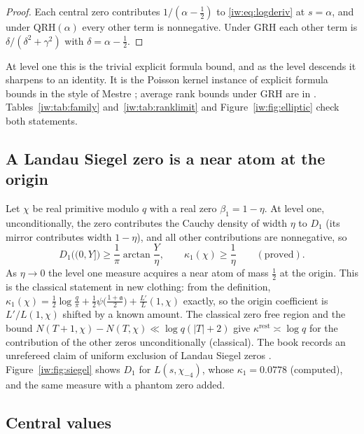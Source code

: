 \begin{proof}
Each central zero contributes $1/(\alpha-\frac12)$ to \eqref{iw:eq:logderiv} at $s=\alpha$, and under $\mathrm{QRH}(\alpha)$ every other term is nonnegative. Under GRH each other term is $\delta/(\delta^2+\gamma^2)$ with $\delta=\alpha-\frac12$.
\end{proof}

At level one this is the trivial explicit formula bound, and as the level descends it sharpens to an identity. It is the Poisson kernel instance of explicit formula bounds in the style of Mestre \cite{NCMestre86}; average rank bounds under GRH are in \cite{NCBrumer92}. Tables~\ref{iw:tab:family} and~\ref{iw:tab:ranklimit} and Figure~\ref{iw:fig:elliptic} check both statements.

\subsection{A Landau Siegel zero is a near atom at the origin}

Let $\chi$ be real primitive modulo $q$ with a real zero $\beta_1=1-\eta$. At level one, unconditionally, the zero contributes the Cauchy density of width $\eta$ to $D_1$ (its mirror contributes width $1-\eta$), and all other contributions are nonnegative, so
\[
D_1\big((0,Y]\big)\ge\frac1\pi\arctan\frac Y\eta,\qquad\kappa_1(\chi)\ge\frac1\eta\qquad(\text{proved}).
\]
As $\eta\to0$ the level one measure acquires a near atom of mass $\frac12$ at the origin. This is the classical statement in new clothing: from the definition, $\kappa_1(\chi)=\frac12\log\frac q\pi+\frac12\psi\big(\frac{1+\mathfrak a}2\big)+\frac{L'}L(1,\chi)$ exactly, so the origin coefficient is $L'/L(1,\chi)$ shifted by a known amount. The classical zero free region and the bound $N(T+1,\chi)-N(T,\chi)\ll\log q(|T|+2)$ give $\kappa^{\mathrm{rest}}\asymp\log q$ for the contribution of the other zeros unconditionally (classical). The book records an unrefereed claim of uniform exclusion of Landau Siegel zeros \cite{NCOAI26c}. Figure~\ref{iw:fig:siegel} shows $D_1$ for $L(s,\chi_{-4})$, whose $\kappa_1=0.0778$ (computed), and the same measure with a phantom zero added.

\subsection{Central values}

